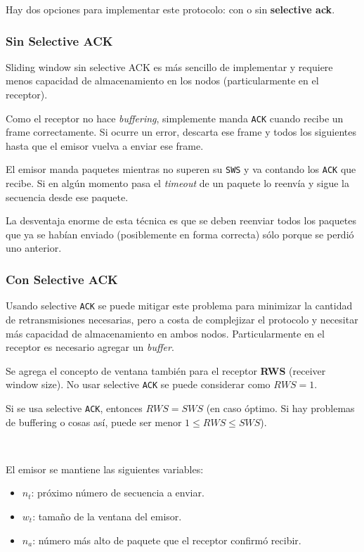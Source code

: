 \documentclass[]{article}
\begin{document}
Hay dos opciones para implementar este protocolo: con o sin \textbf{selective ack}.

\subsubsection{Sin Selective ACK}
Sliding window sin selective ACK es más sencillo de implementar y requiere menos capacidad de almacenamiento en los nodos (particularmente en el receptor).

Como el receptor no hace \emph{buffering}, simplemente manda \texttt{ACK} cuando recibe un frame correctamente. Si ocurre un error, descarta ese frame y todos los siguientes hasta que el emisor vuelva a enviar ese frame.

El emisor manda paquetes mientras no superen su \texttt{SWS} y va contando los \texttt{ACK} que recibe. Si en algún momento pasa el \emph{timeout} de un paquete lo reenvía y sigue la secuencia desde ese paquete.

La desventaja enorme de esta técnica es que se deben reenviar todos los paquetes que ya se habían enviado (posiblemente en forma correcta) sólo porque se perdió uno anterior.



\subsubsection{Con Selective ACK}
Usando selective \texttt{ACK} se puede mitigar este problema para minimizar la cantidad de retransmisiones necesarias, pero a costa de complejizar el protocolo y necesitar más capacidad de almacenamiento en ambos nodos. Particularmente en el receptor es necesario agregar un \emph{buffer}.


Se agrega el concepto de ventana también para el receptor \textbf{RWS} (receiver window size). No usar selective \texttt{ACK} se puede considerar como $RWS = 1$.

Si se usa selective \texttt{ACK}, entonces $RWS = SWS$ (en caso óptimo. Si hay problemas de buffering o cosas así, puede ser menor $1\leq RWS \leq SWS$).

~\newline

El emisor se mantiene las siguientes variables:
\begin{itemize}
    \item $n_t$: próximo número de secuencia a enviar.
    \item $w_t$: tamaño de la ventana del emisor.
    \item $n_a$: número más alto de paquete que el receptor confirmó recibir.
\end{itemize}
\end{document}

